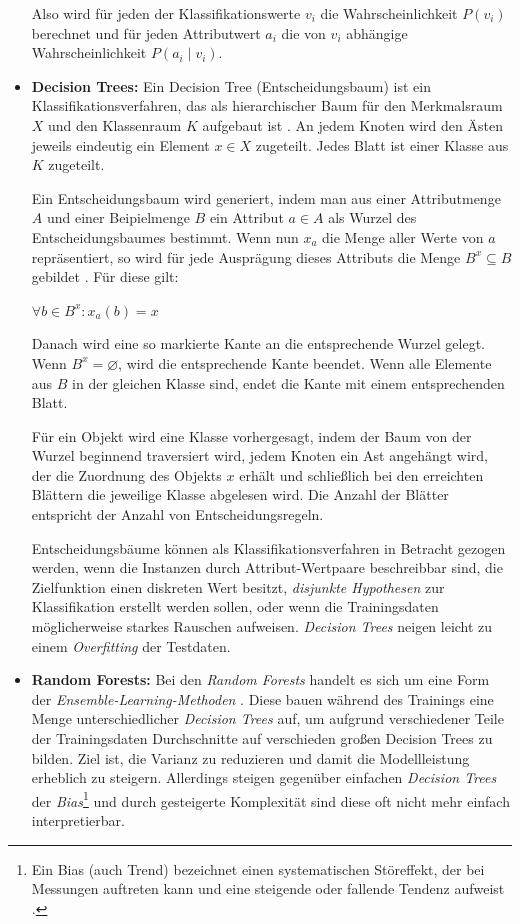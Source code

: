 \begin{itemize}
Also wird für jeden der Klassifikationswerte \(v_i\) die Wahrscheinlichkeit \(P(v_i)\) berechnet und für jeden Attributwert \(a_i\) die von \(v_i\) abhängige Wahrscheinlichkeit \(P(a_i \mid v_i)\).  

\item \textbf{Decision Trees:} Ein Decision Tree (Entscheidungsbaum) ist ein Klassifikationsverfahren, das als hierarchischer Baum für den Merkmalsraum \(X\) und den Klassenraum \(K\) aufgebaut ist . An jedem Knoten wird den Ästen jeweils eindeutig ein Element \(x \in X\) zugeteilt. Jedes Blatt ist einer Klasse aus  \(K\) zugeteilt. 

Ein Entscheidungsbaum wird generiert, indem man aus einer Attributmenge \(A\) und einer Beipielmenge \(B\) ein Attribut \(a \in A\) als Wurzel des Entscheidungsbaumes bestimmt. Wenn nun \(x_a\) die Menge aller Werte von  \(a\) repräsentiert, so wird für jede Ausprägung dieses Attributs die Menge \(B^x \subseteq B\) gebildet . Für diese gilt:

\(\forall b \in B^x : x_a(b)=x\)

Danach wird eine so markierte Kante an die entsprechende Wurzel gelegt. Wenn \(B^x = \varnothing \), wird die entsprechende Kante beendet. 
Wenn alle Elemente aus  \(B\) in der gleichen Klasse sind, endet die Kante mit einem entsprechenden Blatt.

Für ein Objekt wird eine Klasse vorhergesagt, indem der Baum von der Wurzel beginnend traversiert wird, jedem Knoten ein Ast angehängt wird, der die Zuordnung des Objekts \(x\) erhält und schließlich bei den erreichten Blättern die jeweilige Klasse abgelesen wird. Die Anzahl der Blätter entspricht der Anzahl von Entscheidungsregeln. 

Entscheidungsbäume können als Klassifikationsverfahren in Betracht gezogen werden, wenn die Instanzen durch Attribut-Wertpaare beschreibbar sind, die Zielfunktion einen diskreten Wert besitzt, \textit{disjunkte Hypothesen} zur Klassifikation erstellt werden sollen, oder wenn die Trainingsdaten möglicherweise starkes Rauschen aufweisen. \textit{Decision Trees} neigen leicht zu einem \textit{Overfitting} der Testdaten.

\item \textbf{Random Forests:}  Bei den \textit{Random Forests} handelt es sich um eine Form der \textit{Ensemble-Learning-Methoden} . Diese bauen während des Trainings eine Menge unterschiedlicher \textit{Decision Trees} auf, um aufgrund verschiedener Teile der Trainingsdaten Durchschnitte auf verschieden großen Decision Trees zu bilden. Ziel ist, die Varianz zu reduzieren und damit die Modellleistung erheblich zu steigern. Allerdings steigen gegenüber einfachen \textit{Decision Trees} der \textit{Bias}\footnote{Ein Bias (auch Trend) bezeichnet einen systematischen Störeffekt, der bei Messungen auftreten kann und eine steigende oder fallende Tendenz aufweist .} und durch gesteigerte Komplexität sind diese oft nicht mehr einfach interpretierbar.  



\end{itemize}



